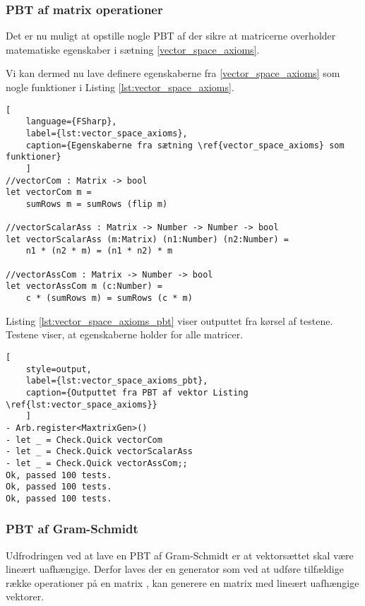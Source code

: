 \subsubsection{PBT af matrix operationer}
Det er nu muligt at opstille nogle PBT af der sikre at matricerne overholder matematiske egenskaber i sætning \ref{vector_space_axioms}. 




Vi kan dermed nu lave definere egenskaberne fra \ref{vector_space_axioms} som nogle funktioner i Listing \ref{lst:vector_space_axioms}.

\begin{lstlisting}[
    language={FSharp}, 
    label={lst:vector_space_axioms}, 
    caption={Egenskaberne fra sætning \ref{vector_space_axioms} som funktioner}
    ]
//vectorCom : Matrix -> bool
let vectorCom m =
    sumRows m = sumRows (flip m)

//vectorScalarAss : Matrix -> Number -> Number -> bool
let vectorScalarAss (m:Matrix) (n1:Number) (n2:Number) =
    n1 * (n2 * m) = (n1 * n2) * m

//vectorAssCom : Matrix -> Number -> bool
let vectorAssCom m (c:Number) =
    c * (sumRows m) = sumRows (c * m)
\end{lstlisting}

Listing \ref{lst:vector_space_axioms_pbt} viser outputtet fra kørsel af testene. Testene viser, at egenskaberne holder for alle matricer.

\begin{lstlisting}[
    style=output, 
    label={lst:vector_space_axioms_pbt}, 
    caption={Outputtet fra PBT af vektor Listing \ref{lst:vector_space_axioms}}
    ]
- Arb.register<MaxtrixGen>()
- let _ = Check.Quick vectorCom
- let _ = Check.Quick vectorScalarAss
- let _ = Check.Quick vectorAssCom;;
Ok, passed 100 tests.
Ok, passed 100 tests.
Ok, passed 100 tests.
\end{lstlisting}

\subsubsection{PBT af Gram-Schmidt}\label{sec:pbt_gram_schmidt}
Udfrodringen ved at lave en PBT af Gram-Schmidt er at vektorsættet skal være lineært uafhængige. Derfor laves der en generator som ved at udføre tilfældige række operationer på en matrix , kan generere en matrix med lineært uafhængige vektorer. 

